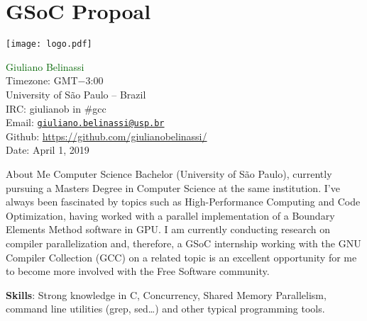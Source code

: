 \chapter{GSoC Propoal}\label{appendex1}
\label{ap:gsoc}


\begin{center}
\Huge \bf
\vspace{0.5cm}
\end{center}
\vspace*{\fill}
{
     \centering
     \texttt{[image: logo.pdf]}
    \par
}
\vspace*{\fill}
\normalsize{
\noindent\textcolor{darkgreen}{Giuliano Belinassi} \\
Timezone: GMT$-$3:00 \\
University of São Paulo -- Brazil \\
IRC: giulianob in \#gcc \\
Email: \href{mailto:giuliano.belinassi@usp.br}{\texttt{giuliano.belinassi@usp.br}} \\
Github: \url{https://github.com/giulianobelinassi/} \\
Date: April 1, 2019
}
\newpage

\begin{section}{About Me}
    Computer Science Bachelor (University of São Paulo), 
    currently pursuing a Masters Degree in Computer Science at the same
    institution. I've always been fascinated by topics such as
    High-Performance Computing and Code Optimization, having worked with
    a parallel implementation of a Boundary Elements Method software in GPU.
    I am currently conducting research on compiler parallelization and,
    therefore, a GSoC internship working with the GNU
    Compiler Collection (GCC) on a related topic is an excellent opportunity
    for me to become more involved with the Free Software community.

    \textbf{Skills}: Strong knowledge in C, Concurrency, Shared Memory Parallelism, command line utilities (grep, sed\dots) and other typical programming tools.
\end{section}

